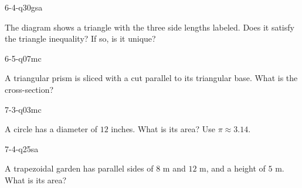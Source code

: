 \begin{practiceQuestion}{6-4-q30}{gsa}
\begin{questionText}
The diagram shows a triangle with the three side lengths labeled. Does it satisfy the triangle inequality? If so, is it unique?

\begin{center}
\end{center}
\end{questionText}
\end{practiceQuestion}

\begin{practiceQuestion}{6-5-q07}{mc}
\begin{questionText}
A triangular prism is sliced with a cut parallel to its triangular base. What is the cross-section?
\end{questionText}
\end{practiceQuestion}

\begin{practiceQuestion}{7-3-q03}{mc}
\begin{questionText}
A circle has a diameter of $12$ inches. What is its area? Use $\pi \approx 3.14$.
\end{questionText}
\end{practiceQuestion}

\begin{practiceQuestion}{7-4-q25}{sa}
\begin{questionText}
A trapezoidal garden has parallel sides of $8$ m and $12$ m, and a height of $5$ m. What is its area?
\end{questionText}
\end{practiceQuestion}

